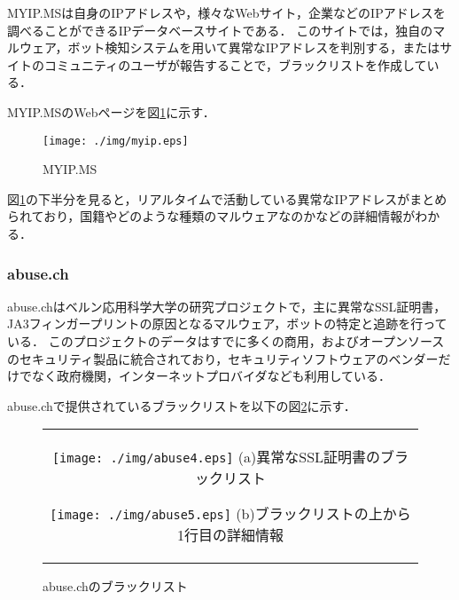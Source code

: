 \documentclass{thesis}
\begin{document}
MYIP.MS\cite{myip}は自身のIPアドレスや，様々なWebサイト，企業などのIPアドレスを調べることができるIPデータベースサイトである．
このサイトでは，独自のマルウェア，ボット検知システムを用いて異常なIPアドレスを判別する，またはサイトのコミュニティのユーザが報告することで，ブラックリストを作成している．

MYIP.MSのWebページを図\ref{fig:myip}に示す．

\begin{figure}[H]
 \center
 \texttt{[image: ./img/myip.eps]}
 \caption{MYIP.MS}
 \label{fig:myip}
\end{figure}

図\ref{fig:myip}の下半分を見ると，リアルタイムで活動している異常なIPアドレスがまとめられており，国籍やどのような種類のマルウェアなのかなどの詳細情報がわかる．

\subsubsection*{abuse.ch}

abuse.ch\cite{abuse.ch}はベルン応用科学大学の研究プロジェクトで，主に異常なSSL証明書，JA3フィンガープリントの原因となるマルウェア，ボットの特定と追跡を行っている．
このプロジェクトのデータはすでに多くの商用，およびオープンソースのセキュリティ製品に統合されており，セキュリティソフトウェアのベンダーだけでなく政府機関，インターネットプロバイダなども利用している．

abuse.chで提供されているブラックリストを以下の図\ref{fig:abuse}に示す．

\begin{figure}[htbp]
\begin{center}
  \begin{tabular}{c}

    \begin{minipage}[b]{0.5\hsize}
      \begin{center}
        \texttt{[image: ./img/abuse4.eps]}
        \hspace{1.7cm} (a)異常なSSL証明書のブラックリスト
      \end{center}
    \end{minipage}

    \begin{minipage}[b]{0.5\hsize}
      \begin{center}
        \texttt{[image: ./img/abuse5.eps]}
        \hspace{1.7cm} (b)ブラックリストの上から1行目の詳細情報
      \end{center}
    \end{minipage}

  \end{tabular}
  \caption{abuse.chのブラックリスト}
  \label{fig:abuse}
  \end{center}
\end{figure}
\end{document}
